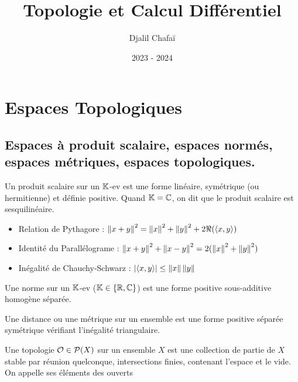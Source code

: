 \documentclass{cours}
\title{Topologie et Calcul Différentiel}
\author{Djalil Chafaï}
\date{2023 - 2024}
\begin{document}
\newpage
\section{Espaces Topologiques}

\subsection{Espaces à produit scalaire, espaces normés, espaces métriques, espaces topologiques.}

\begin{definition}
    Un produit scalaire sur un $\mathbb{K}$-ev est une forme linéaire, symétrique (ou hermitienne) et définie positive.
    Quand $\mathbb{K} = \mathbb{C}$, on dit que le produit scalaire est sesquilinéaire.
\end{definition}

\begin{proposition}
    \begin{itemize}
        \item Relation de Pythagore : $\left\lVert x + y \right\rVert^{2} = \left\lVert x \right\rVert^{2} + \left\lVert y \right\rVert^{2} + 2\Re(\left\langle x, y \right\rangle)$
        \item Identité du Parallélograme : $\left\lVert x + y \right\rVert^{2} + \left\lVert x - y \right\rVert^{2} = 2(\left\lVert x \right\rVert^{2} + \left\lVert y \right\rVert^{2})$
        \item Inégalité de Chauchy-Schwarz : $\left|\left\langle x, y \right\rangle\right| \leq \left\lVert x \right\rVert\left\lVert y \right\rVert$
    \end{itemize}
\end{proposition}

\begin{definition}
    Une norme sur un $\mathbb{K}$-ev ($\mathbb{K} \in\left\{\mathbb{R}, \mathbb{C}\right\}$) est une forme positive sous-additive homogène séparée.
\end{definition}

\begin{definition}
    Une distance ou une métrique sur un ensemble est une forme positive séparée symétrique vérifiant l'inégalité triangulaire.
\end{definition}

\begin{definition}
    Une topologie $\mathcal{O} \in \mathcal{P}(X)$ sur un ensemble $X$ est une collection de partie de $X$ stable par réunion quelconque, intersections finies, contenant l'espace et le vide. On appelle ses éléments des ouverts
\end{definition}
\end{document}
